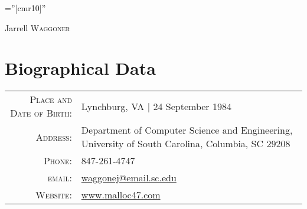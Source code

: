 \documentclass[a4paper,10pt]{article}
\begin{document}

\pagestyle{empty} %

\font\fb=''[cmr10]'' %

\par{\centering
		{\Huge Jarrell \textsc{Waggoner}
	}\bigskip\par}

\section{Biographical Data}

\begin{tabular}{r p{3.5in}}
	\textsc{Place and Date of Birth:} & Lynchburg, VA \hspace{0.5em} | \hspace{0.5em} 24 September 1984 \\
	\textsc{Address:}	& Department of Computer Science and Engineering, University of South Carolina, Columbia, SC 29208 \\
    \textsc{Phone:}     & 847-261-4747\\
    \textsc{email:}     & \href{mailto:waggonej@email.sc.edu}{waggonej@email.sc.edu} \\
	\textsc{Website:}	& \href{http://www.malloc47.com}{www.malloc47.com}
\end{tabular}

\end{document}
